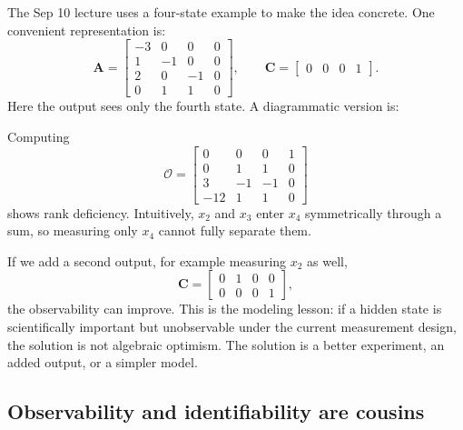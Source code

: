 \documentclass[a4paper]{article}
\newcommand{\mat}[1]{\mathbf{#1}}
\newcommand{\A}{\mat A}
\newcommand{\C}{\mat C}
\newcommand{\Obs}{\mathcal O}
\begin{document}
The Sep 10 lecture uses a four-state example to make the idea concrete. One convenient representation is:
\[
  \A=
  \begin{bmatrix}
  -3&0&0&0\\
  1&-1&0&0\\
  2&0&-1&0\\
  0&1&1&0
  \end{bmatrix},
  \qquad
  \C=\begin{bmatrix}0&0&0&1\end{bmatrix}.
\]
Here the output sees only the fourth state. A diagrammatic version is:
\begin{center}
\end{center}
Computing
\[
  \Obs=
  \begin{bmatrix}
  0&0&0&1\\
  0&1&1&0\\
  3&-1&-1&0\\
  -12&1&1&0
  \end{bmatrix}
\]
shows rank deficiency. Intuitively, \(x_2\) and \(x_3\) enter \(x_4\) symmetrically through a sum, so measuring only \(x_4\) cannot fully separate them.

If we add a second output, for example measuring \(x_2\) as well,
\[
  \C=
  \begin{bmatrix}
  0&1&0&0\\
  0&0&0&1
  \end{bmatrix},
\]
the observability can improve. This is the modeling lesson: if a hidden state is scientifically important but unobservable under the current measurement design, the solution is not algebraic optimism. The solution is a better experiment, an added output, or a simpler model.

\subsection{Observability and identifiability are cousins}
\end{document}
